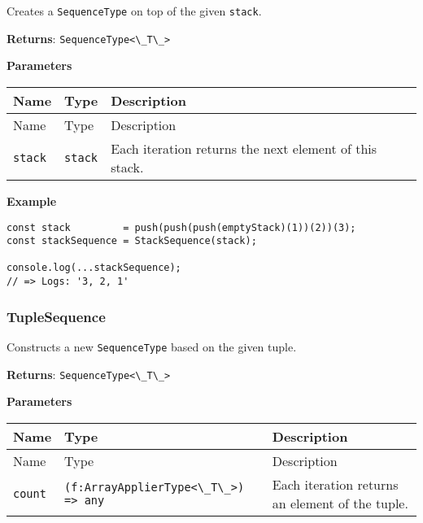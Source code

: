 Creates a \passthrough{\lstinline!SequenceType!} on top of the given
\passthrough{\lstinline!stack!}.

\textbf{Returns}: \passthrough{\lstinline!SequenceType<\_T\_>!}

\textbf{Parameters}

\begin{longtable}[]{
  >{\raggedright\arraybackslash}p{}
  >{\raggedright\arraybackslash}p{}
  >{\raggedright\arraybackslash}p{}@{}}

\toprule\noalign{}
Name & Type & Description \\
\midrule\noalign{}
\endfirsthead
\toprule\noalign{}
Name & Type & Description \\
\midrule\noalign{}
\endhead
\bottomrule\noalign{}
\endlastfoot
\passthrough{\lstinline!stack!} & \passthrough{\lstinline!stack!} & Each
iteration returns the next element of this stack. \\
\end{longtable}

\textbf{Example}

\begin{lstlisting}[label=4970f526-c453-4fad-a16a-c8a8cf65dbfd]
const stack         = push(push(push(emptyStack)(1))(2))(3);
const stackSequence = StackSequence(stack);
                                                            
console.log(...stackSequence);
// => Logs: '3, 2, 1'
\end{lstlisting}

\hypertarget{fcc27098-0cc2-44bc-98e9-51b45c2612d4}{%
\subsubsection{TupleSequence}\label{fcc27098-0cc2-44bc-98e9-51b45c2612d4}}

Constructs a new \passthrough{\lstinline!SequenceType!} based on the
given tuple.

\textbf{Returns}: \passthrough{\lstinline!SequenceType<\_T\_>!}

\textbf{Parameters}

\begin{longtable}[]{
  >{\raggedright\arraybackslash}p{}
  >{\raggedright\arraybackslash}p{}
  >{\raggedright\arraybackslash}p{}@{}}

\toprule\noalign{}
Name & Type & Description \\
\midrule\noalign{}
\endfirsthead
\toprule\noalign{}
Name & Type & Description \\
\midrule\noalign{}
\endhead
\bottomrule\noalign{}
\endlastfoot
\passthrough{\lstinline!count!} &
\passthrough{\lstinline!(f:ArrayApplierType<\_T\_>) => any!} & Each
iteration returns an element of the tuple. \\
\end{longtable}

